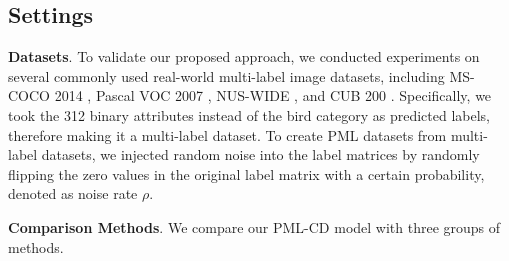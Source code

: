 \documentclass[letterpaper]{article} %
\begin{document}
\subsection{Settings}

  \textbf{Datasets}. To validate our proposed approach, we conducted experiments on several commonly used real-world multi-label image datasets, including MS-COCO 2014 \cite{COCO}, Pascal VOC 2007 \cite{VOC}, NUS-WIDE \cite{NUS-WIDE}, and CUB 200 \cite{CUB}. 
  Specifically,  we took the 312 binary attributes instead of the bird category as predicted labels, therefore making it a multi-label dataset. To create PML datasets from multi-label datasets, we injected random noise into the label matrices by randomly flipping the zero values in the original label matrix with a certain probability, denoted as noise rate $\rho$. 

  \textbf{Comparison Methods}. We compare our PML-CD model with three groups of methods. 
\end{document}
